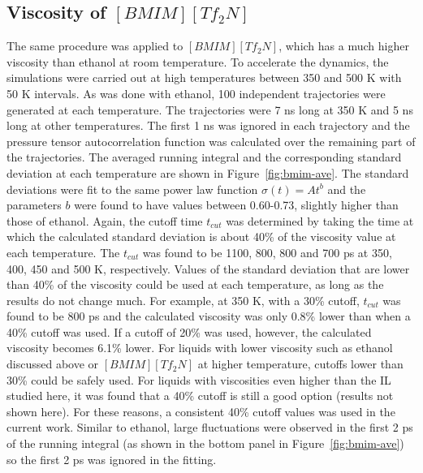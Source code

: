 \documentclass[12pt]{article}
\begin{document}
\subsection{Viscosity of $[BMIM][Tf_2N]$}

The same procedure was applied to $[BMIM][Tf_2N]$,
which has a much higher viscosity than ethanol at room temperature.
To accelerate the dynamics, 
the simulations were carried out at high temperatures between 350 and 500 K with 50 K intervals.
As was done with ethanol,
100 independent trajectories were generated at each temperature.
The trajectories were 7 ns long at 350 K and 5 ns long at other temperatures.
The first 1 ns was ignored in each trajectory and the pressure tensor autocorrelation function
was calculated over the remaining part of the trajectories.
The averaged running integral and the corresponding standard deviation at each temperature
are shown in Figure~\ref{fig:bmim-ave}.
The standard deviations were fit to the same power law function $\sigma(t)=A t^b$
and the parameters $b$ were found to have values between 0.60-0.73,
slightly higher than those of ethanol.
Again, the cutoff time $t_{cut}$ was determined by taking the time at which
the calculated standard deviation is about 40\% of the viscosity value at each temperature.
The $t_{cut}$ was found to be 1100, 800, 800 and 700 ps at 350, 400, 450 and 500 K, respectively.
Values of the standard deviation that are lower than 40\% of the viscosity could be used at each temperature, as long as the results do not change much.
For example, at 350 K, 
with a 30\% cutoff,  $t_{cut}$ was found to be 800 ps and the calculated viscosity was only 0.8\% lower than when a 40\% cutoff was used.
If a cutoff of 20\% was used, however, the calculated viscosity becomes 6.1\% lower.
For liquids with lower viscosity such as ethanol discussed above or $[BMIM][Tf_2N]$ at higher temperature,
cutoffs lower than 30\% could be safely used.
For liquids with viscosities even higher than the IL studied here, 
it was found that a 40\% cutoff is still a good option (results not shown here). For these reasons, a consistent 40\% cutoff values was used in the current work.
Similar to ethanol,
large fluctuations were observed in the first 2 ps of the running integral (as shown in the bottom panel in Figure~\ref{fig:bmim-ave})
so the first 2 ps was ignored in the fitting.
\end{document}
